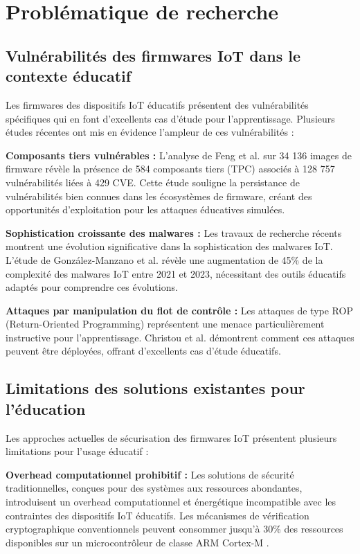 \section{Problématique de recherche}

\subsection{Vulnérabilités des firmwares IoT dans le contexte éducatif}

Les firmwares des dispositifs \ac{IoT} éducatifs présentent des vulnérabilités spécifiques qui en font d'excellents cas d'étude pour l'apprentissage. Plusieurs études récentes ont mis en évidence l'ampleur de ces vulnérabilités :

\textbf{Composants tiers vulnérables :} L'analyse de Feng et al. \cite{Feng2022OneBadApple} sur 34 136 images de firmware révèle la présence de 584 composants tiers (\ac{TPC}) associés à 128 757 vulnérabilités liées à 429 \ac{CVE}. Cette étude souligne la persistance de vulnérabilités bien connues dans les écosystèmes de firmware, créant des opportunités d'exploitation pour les attaques éducatives simulées.

\textbf{Sophistication croissante des malwares :} Les travaux de recherche récents montrent une évolution significative dans la sophistication des malwares IoT. L'étude de González-Manzano et al. \cite{Gonzalez2024ExploringShifting} révèle une augmentation de 45\% de la complexité des malwares IoT entre 2021 et 2023, nécessitant des outils éducatifs adaptés pour comprendre ces évolutions.

\textbf{Attaques par manipulation du flot de contrôle :} Les attaques de type \ac{ROP} (Return-Oriented Programming) représentent une menace particulièrement instructive pour l'apprentissage. Christou et al. \cite{Christou2024DAEDALUS} démontrent comment ces attaques peuvent être déployées, offrant d'excellents cas d'étude éducatifs.

\subsection{Limitations des solutions existantes pour l'éducation}

Les approches actuelles de sécurisation des firmwares IoT présentent plusieurs limitations pour l'usage éducatif :

\textbf{Overhead computationnel prohibitif :} Les solutions de sécurité traditionnelles, conçues pour des systèmes aux ressources abondantes, introduisent un overhead computationnel et énergétique incompatible avec les contraintes des dispositifs IoT éducatifs. Les mécanismes de vérification cryptographique conventionnels peuvent consommer jusqu'à 30\% des ressources disponibles sur un microcontrôleur de classe ARM Cortex-M \cite{Khan2024EfficiencySecurity}.

